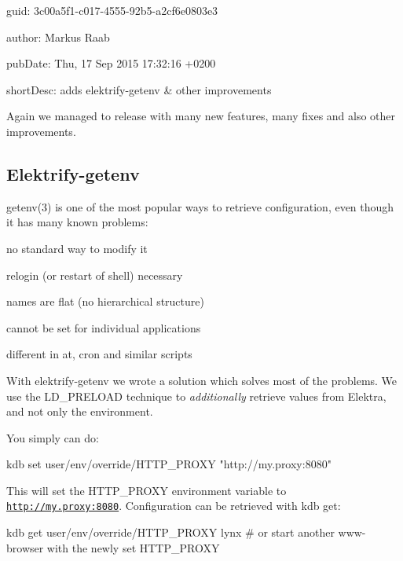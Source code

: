 
\begin{DoxyItemize}
\item guid\+: 3c00a5f1-\/c017-\/4555-\/92b5-\/a2cf6e0803e3
\item author\+: Markus Raab
\item pub\+Date\+: Thu, 17 Sep 2015 17\+:32\+:16 +0200
\item short\+Desc\+: adds elektrify-\/getenv \& other improvements
\end{DoxyItemize}

Again we managed to release with many new features, many fixes and also other improvements.

\subsection*{Elektrify-\/getenv}

getenv(3) is one of the most popular ways to retrieve configuration, even though it has many known problems\+:


\begin{DoxyItemize}
\item no standard way to modify it
\item relogin (or restart of shell) necessary
\item names are flat (no hierarchical structure)
\item cannot be set for individual applications
\item different in at, cron and similar scripts
\end{DoxyItemize}

With elektrify-\/getenv we wrote a solution which solves most of the problems. We use the {\ttfamily L\+D\+\_\+\+P\+R\+E\+L\+O\+AD} technique to {\itshape additionally} retrieve values from Elektra, and not only the environment.

You simply can do\+:


\begin{DoxyCode}
kdb set user/env/override/HTTP\_PROXY "http://my.proxy:8080"
\end{DoxyCode}


This will set the {\ttfamily H\+T\+T\+P\+\_\+\+P\+R\+O\+XY} environment variable to {\ttfamily \href{http://my.proxy:8080}{\tt http\+://my.\+proxy\+:8080}}. Configuration can be retrieved with {\ttfamily kdb get}\+:


\begin{DoxyCode}
kdb get user/env/override/HTTP\_PROXY
lynx   # or start another www-browser with the newly set HTTP\_PROXY
\end{DoxyCode}


